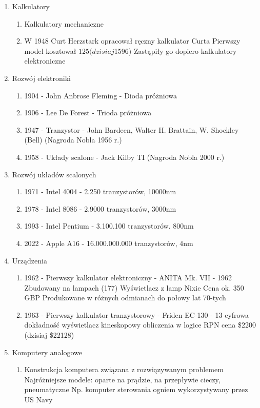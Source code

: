 \documentclass[a4paper,twoside,onecolumn]{report}
\begin{document}
\begin{enumerate}[-]
\begin{enumerate}[*]
				\end{enumerate}
			\item Kalkulatory
				\begin{enumerate}[*]
					\item Kalkulatory mechaniczne
					\item W 1948 Curt Herzstark opracował ręczny kalkulator Curta Pierwszy model kosztował $125 (dzisiaj $1596) Zastąpiły go dopiero kalkulatory elektroniczne
				\end{enumerate}
			\item Rozwój elektroniki
				\begin{enumerate}[*]
					\item 1904 - John Anbrose Fleming - Dioda próżniowa
					\item 1906 - Lee De Forest - Trioda próżniowa
					\item 1947 - Tranzystor - John Bardeen, Walter H. Brattain, W. Shockley (Bell) (Nagroda Nobla 1956 r.)
					\item 1958 - Układy scalone - Jack Kilby TI (Nagroda Nobla 2000 r.)
				\end{enumerate}
			\item Rozwój układów scalonych
				\begin{enumerate}[*]
					\item 1971 - Intel 4004 - 2.250 tranzystorów, 10000nm
					\item 1978 - Intel 8086 - 2.9000 tranzystorów, 3000nm
					\item 1993 - Intel Pentium - 3.100.100 tranzystorów. 800nm
					\item 2022 - Apple A16 - 16.000.000.000 tranzystorów, 4nm
				\end{enumerate}
			\item Urządzenia
				\begin{enumerate}[*]
					\item 1962 - Pierwszy kalkulator elektroniczny - ANITA Mk. VII - 1962 Zbudowany na lampach (177) Wyświetlacz z lamp Nixie Cena ok. 350 GBP Produkowane 						w różnych odmianach do połowy lat 70-tych
					\item 1963 - Pierwszy kalkulator tranzystorowy - Friden EC-130 - 13 cyfrowa dokładność wyświetlacz kineskopowy obliczenia w logice RPN cena \$2200 (dzisiaj 							\$22128)
				\end{enumerate}
			\item Komputery analogowe
				\begin{enumerate}[*]
					\item Konstrukcja komputera związana z rozwiązywanym problemem Najróżniejsze modele: oparte na prądzie, na przepływie cieczy, pneumatyczne Np. 								komputer sterowania ogniem wykorzystywany przez US Navy

\end{enumerate}
\end{enumerate}
\end{document}
